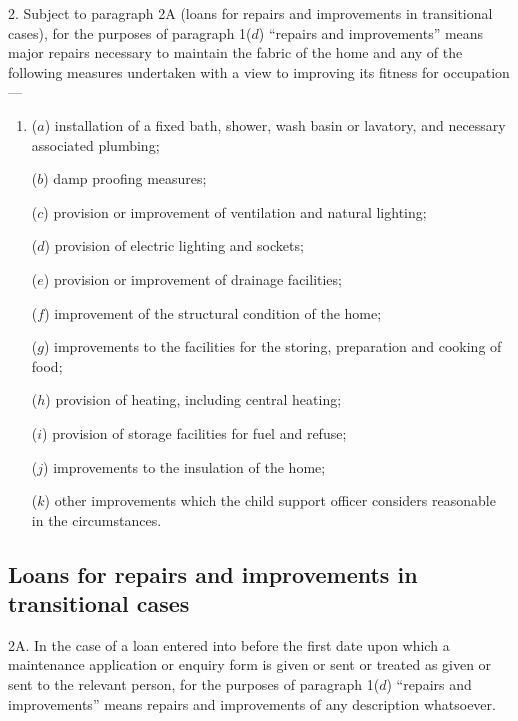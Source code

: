 \documentclass[12pt,a4paper]{article}
\begin{document}
2.  %
Subject to paragraph 2A (loans for repairs and improvements in transitional cases), for the purposes of  %
paragraph 1($d$) “repairs and improvements” means major repairs necessary to maintain the fabric of the home and any of the following measures undertaken with a view to improving its fitness for occupation—
\begin{enumerate}\item[]
($a$) installation of a fixed bath, shower, wash basin or lavatory, and necessary associated plumbing;

($b$) damp proofing measures;

($c$) provision or improvement of ventilation and natural lighting;

($d$) provision of electric lighting and sockets;

($e$) provision or improvement of drainage facilities;

($f$) improvement of the structural condition of the home;

($g$) improvements to the facilities for the storing, preparation and cooking of food;

($h$) provision of heating, including central heating;

($i$) provision of storage facilities for fuel and refuse;

($j$) improvements to the insulation of the home;

($k$) other improvements which the child support officer considers reasonable in the circumstances.
\end{enumerate}


\subsection*{Loans for repairs and improvements in transitional cases}

2A.  In the case of a loan entered into before the first date upon which a maintenance application or enquiry form is given or sent or treated as given or sent to the relevant person, for the purposes of paragraph 1($d$) “repairs and improvements” means repairs and improvements of any description whatsoever.

\end{document}
